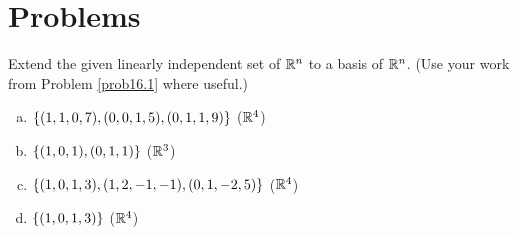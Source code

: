 \section*{Problems}


\begin{prob} \label{prob17.1} Extend the given linearly independent set of $\mathbb{R}^n$ to a basis of $\mathbb{R}^n$.  (Use your work  from Problem \ref{prob16.1} where useful.)
\medskip
\begin{enumerate}[a)]
\item $\{(1, 1, 0, 7),(0, 0, 1, 5),(0,1,1,9) \}$ ($\mathbb{R}^4$)
\medskip
% 
\item\sov $\{(1, 0,1), (0,1,1) \}$ ($\mathbb{R}^3$)
\medskip
%
\item $\{(1, 0, 1, 3), (1, 2, -1, -1), (0, 1, -2, 5) \}$ ($\mathbb{R}^4$)
\medskip
%
\item\sov $\{(1, 0, 1, 3) \}$ ($\mathbb{R}^4$)
\medskip
%
\end{enumerate}
\end{prob} 